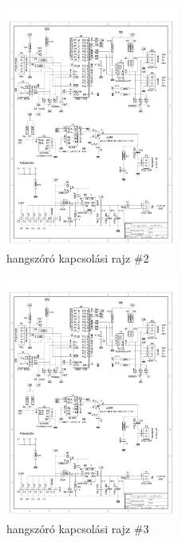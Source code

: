 \documentclass[tocnopagenum]{thesis-ekf}
\theoremstyle{definition}
\theoremstyle{remark}
\begin{document}
	\begin{figure}[h!]
		\centering
		\includegraphics[page=2,width=0.5\textwidth]{SLH}
		
		\caption[Hangszoró]{hangszóró kapcsolási rajz \#2}
		\label{fig:hangsz2}
	\end{figure}
	\begin{figure}[h!]
	
		\centering
		\includegraphics[page=3,width=0.5\textwidth]{SLH}
		
		\caption[Hangszoró]{hangszóró kapcsolási rajz \#3}
		\label{fig:hangsz3}\medskip
	\end{figure} 
\end{document}
